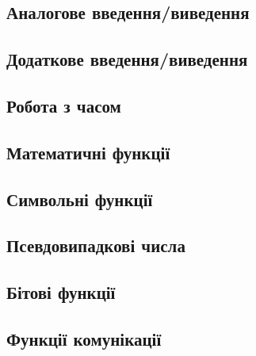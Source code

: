 \documentclass[12pt,a4paper]{book}  %
\begin{document}
\subsection{Аналогове введення/виведення}
\subsection{Додаткове введення/виведення}
\subsection{Робота з часом}
\subsection{Математичні функції}
\subsection{Символьні функції}
\subsection{Псевдовипадкові числа}
\subsection{Бітові функції}
\subsection{Функції комунікації}
\end{document}
